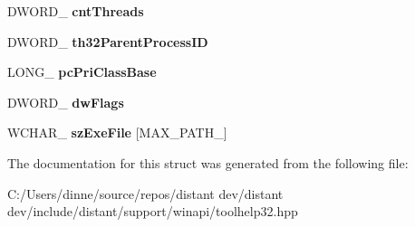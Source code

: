 \begin{DoxyCompactItemize}
D\+W\+O\+R\+D\+\_\+ {\bfseries cnt\+Threads}
\item 
\mbox{\label{structboost_1_1winapi_1_1tag_p_r_o_c_e_s_s_e_n_t_r_y32_w___af2dfa5c4dee07d7f0b1f1e8ebd1657eb}} 
D\+W\+O\+R\+D\+\_\+ {\bfseries th32\+Parent\+Process\+ID}
\item 
\mbox{\label{structboost_1_1winapi_1_1tag_p_r_o_c_e_s_s_e_n_t_r_y32_w___a9aa2e403d8ff37dcd01e345211d345a6}} 
L\+O\+N\+G\+\_\+ {\bfseries pc\+Pri\+Class\+Base}
\item 
\mbox{\label{structboost_1_1winapi_1_1tag_p_r_o_c_e_s_s_e_n_t_r_y32_w___a455ca1e6fd2198652c8db083f7166000}} 
D\+W\+O\+R\+D\+\_\+ {\bfseries dw\+Flags}
\item 
\mbox{\label{structboost_1_1winapi_1_1tag_p_r_o_c_e_s_s_e_n_t_r_y32_w___a396dfe264f873bf19f13ea0a6378a133}} 
W\+C\+H\+A\+R\+\_\+ {\bfseries sz\+Exe\+File} \mbox{[}M\+A\+X\+\_\+\+P\+A\+T\+H\+\_\+\mbox{]}
\end{DoxyCompactItemize}


The documentation for this struct was generated from the following file\+:\begin{DoxyCompactItemize}
\item 
C\+:/\+Users/dinne/source/repos/distant dev/distant dev/include/distant/support/winapi/toolhelp32.\+hpp\end{DoxyCompactItemize}
